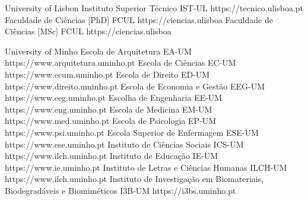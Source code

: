 \begin{ntUniversity}{University of Lisbon}
                  {Instituto Superior Técnico}%
                  {IST-UL}%
                  {https://tecnico.ulisboa.pt}
                  {Faculdade de Ciências [PhD]}%
                  {FCUL}%
                  {https://ciencias.ulisboa}
                  {Faculdade de Ciências [MSc]}%
                  {FCUL}%
                  {https://ciencias.ulisboa}
\end{ntUniversity}

\begin{ntUniversity}{University of Minho}
                  {Escola de Arquitetura}%
                  {EA-UM}%
                  {https://www.arquitetura.uminho.pt}
                  {Escola de Ciências}%
                  {EC-UM}%
                  {https://www.ecum.uminho.pt}
                  {Escola de Direito}%
                  {ED-UM}%
                  {https://www.direito.uminho.pt}
                  {Escola de Economia e Gestão}%
                  {EEG-UM}%
                  {https://www.eeg.uminho.pt}
                  {Escolha de Engenharia}%
                  {EE-UM}%
                  {https://www.eng.uminho.pt}
                  {Escola de Medicina}%
                  {EM-UM}%
                  {https://www.med.uminho.pt}
                  {Escola de Psicologia}%
                  {EP-UM}%
                  {https://www.psi.uminho.pt}
                  {Escola Superior de Enfermagem}%
                  {ESE-UM}%
                  {https://www.ese.uminho.pt}
                  {Instituto de Ciências Sociais}%
                  {ICS-UM}%
                  {https://www.ilch.uminho.pt}
                  {Instituto de Educação}%
                  {IE-UM}%
                  {https://www.ie.uminho.pt}
                  {Instituto de Letras e Ciências Humanas}%
                  {ILCH-UM}%
                  {https://www.ilch.uminho.pt}
                  {Instituto de Investigação em Biomateriais, Biodegradáveis e Biomiméticos}%
                  {I3B-UM}%
                  {https://i3bs.uminho.pt}
\end{ntUniversity}

